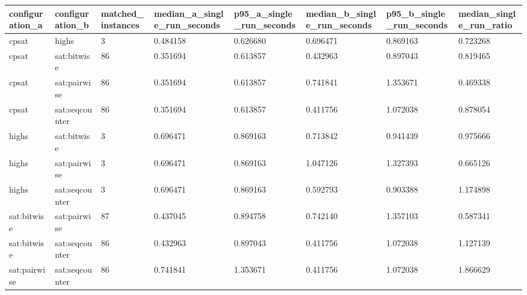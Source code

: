 \begin{tabular}{llllllll}
\hline
configuration\_a & configuration\_b & matched\_instances & median\_a\_single\_run\_seconds & p95\_a\_single\_run\_seconds & median\_b\_single\_run\_seconds & p95\_b\_single\_run\_seconds & median\_single\_run\_ratio \\
\hline
cpsat & highs & 3 & 0.484158 & 0.626680 & 0.696471 & 0.869163 & 0.723268 \\
cpsat & sat:bitwise & 86 & 0.351694 & 0.613857 & 0.432963 & 0.897043 & 0.819465 \\
cpsat & sat:pairwise & 86 & 0.351694 & 0.613857 & 0.741841 & 1.353671 & 0.469338 \\
cpsat & sat:seqcounter & 86 & 0.351694 & 0.613857 & 0.411756 & 1.072038 & 0.878054 \\
highs & sat:bitwise & 3 & 0.696471 & 0.869163 & 0.713842 & 0.941439 & 0.975666 \\
highs & sat:pairwise & 3 & 0.696471 & 0.869163 & 1.047126 & 1.327393 & 0.665126 \\
highs & sat:seqcounter & 3 & 0.696471 & 0.869163 & 0.592793 & 0.903388 & 1.174898 \\
sat:bitwise & sat:pairwise & 87 & 0.437045 & 0.894758 & 0.742140 & 1.357103 & 0.587341 \\
sat:bitwise & sat:seqcounter & 86 & 0.432963 & 0.897043 & 0.411756 & 1.072038 & 1.127139 \\
sat:pairwise & sat:seqcounter & 86 & 0.741841 & 1.353671 & 0.411756 & 1.072038 & 1.866629 \\
\hline
\end{tabular}
